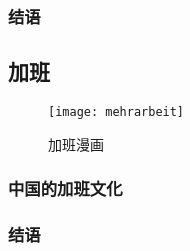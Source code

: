 \subsubsection{结语}

\subsection{加班}
\begin{figure}[htb]
    \centering
    \texttt{[image: mehrarbeit]}
    \caption{加班漫画}
\end{figure}

\subsubsection{中国的加班文化}

\subsubsection{结语}
